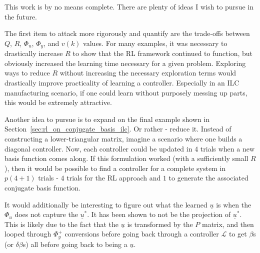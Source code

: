 This work is by no means complete. There are plenty of ideas I wish to pursue in the future.

The first item to attack more rigorously and quantify are the trade-offs between $Q$, $R$, $\Phi_u$, $\Phi_y$, and $v(k)$ values. For many examples, it was necessary to drastically increase $R$ to show that the RL framework continued to function, but obviously increased the learning time necessary for a given problem. Exploring ways to reduce $R$ without increasing the necessary exploration terms would drastically improve practicality of learning a controller. Especially in an ILC manufacturing scenario, if one could learn without purposely messing up parts, this would be extremely attractive. 

Another idea to pursue is to expand on the final example shown in Section~\ref{sec:rl_on_conjugate_basis_ilc}. Or rather - reduce it. Instead of constructing a lower-triangular matrix, imagine a scenario where one builds a diagonal controller. Now, each controller could be updated in $4$ trials when a new basis function comes along. If this formulation worked (with a sufficiently small $R$), then it would be possible to find a controller for a complete system in $p(4 + 1)$ trials - $4$ trials for the RL approach and $1$ to generate the associated conjugate basis function.

It would additionally be interesting to figure out what the learned $\underline{u}$ is when the $\Phi_u$ does not capture the $\underline{u}^\ast$. It has been shown to not be the projection of $\underline{u}^\ast$. This is likely due to the fact that the $\underline{u}$ is transformed by the $P$ matrix, and then looped through $\Phi_y^+$ conversions before going back through a controller $\mathcal{L}$ to get $\beta$s (or $\delta \beta$s) all before going back to being a $\underline{u}$.

